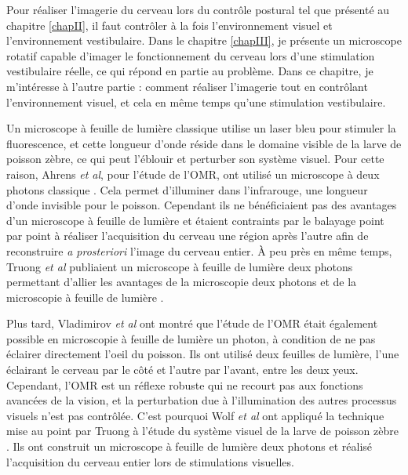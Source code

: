 
Pour réaliser l'imagerie du cerveau lors du contrôle postural tel que présenté au chapitre \ref{chapII}, il faut contrôler à la fois l'environnement visuel et l'environnement vestibulaire.
Dans le chapitre \ref{chapIII}, je présente un microscope rotatif capable d'imager le fonctionnement du cerveau lors d'une stimulation vestibulaire réelle, ce qui répond en partie au problème. Dans ce chapitre, je m'intéresse à l'autre partie : comment réaliser l'imagerie tout en contrôlant l'environnement visuel, et cela en même temps qu'une stimulation vestibulaire.

Un microscope à feuille de lumière classique utilise un laser bleu pour stimuler la fluorescence, et cette longueur d'onde réside dans le domaine visible de la larve de poisson zèbre, ce qui peut l'éblouir et perturber son système visuel. Pour cette raison, Ahrens \emph{et al}, pour l'étude de l'OMR, ont utilisé un microscope à deux photons classique \cite{ahrens_brain-wide_2012}. Cela permet d'illuminer dans l'infrarouge, une longueur d'onde invisible pour le poisson. Cependant ils ne bénéficiaient pas des avantages d'un microscope à feuille de lumière et étaient contraints par le balayage point par point à réaliser l'acquisition du cerveau une région après l'autre afin de reconstruire \emph{a prosteriori} l'image du cerveau entier. À peu près en même temps, Truong \emph{et al} publiaient un microscope à feuille de lumière deux photons permettant d'allier les avantages de la microscopie deux photons et de la microscopie à feuille de lumière \cite{truong_deep_2011}.

Plus tard, Vladimirov \emph{et al} \cite{vladimirov_light-sheet_2014} ont montré que l'étude de l'OMR était également possible en microscopie à feuille de lumière un photon, à condition de ne pas éclairer directement l'oeil du poisson. Ils ont utilisé deux feuilles de lumière, l'une éclairant le cerveau par le côté et l'autre par l'avant, entre les deux yeux. Cependant, l'OMR est un réflexe robuste qui ne recourt pas aux fonctions avancées de la vision, et la perturbation due à l'illumination des autres processus visuels n'est pas contrôlée. C'est pourquoi Wolf \emph{et al} ont appliqué la technique mise au point par Truong à l'étude du système visuel de la larve de poisson zèbre \cite{wolf_whole-brain_2015}. Ils ont construit un microscope à feuille de lumière deux photons et réalisé l'acquisition du cerveau entier lors de stimulations visuelles.

